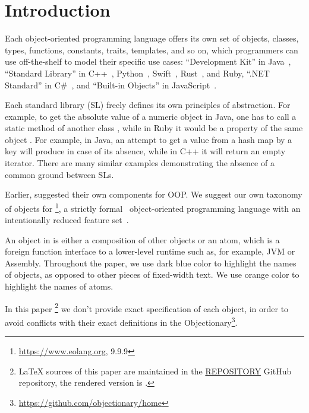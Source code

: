 
\section{Introduction}

Each object-oriented programming language offers its own set of objects,
  classes, types, functions, constants, traits, templates, and so on,
  which programmers can use off-the-shelf to model their specific use cases:
  ``Development Kit'' in Java~\citep{jdk2024,jdk8},
  ``Standard Library'' in
    C++~\citep{cpp2024,josuttis2012cpp},
    Python~\citep{python2024,hellmann2017python},
    Swift~\citep{swift2024,deitel2015swift},
    Rust~\citep{rust2024,blandy2021rust},
    and
    Ruby,
  ``.NET Standard'' in C\#~\citep{net2023,abrams2005net},
  and ``Built-in Objects'' in JavaScript~\citep{js2024,crockford2008js}.

Each standard library (SL) freely defines its own principles of abstraction.
For example, to get the absolute value of a numeric object  in Java,
  one has to call a static method of another class ,
  while in Ruby it would be a property of the same object .
For example, in Java, an attempt to get a value from a hash map by
  a key will produce  in case of its absence,
  while in C++ it will return an empty iterator.
There are many similar examples demonstrating
  the absence of a common ground between SLs.

Earlier, \citet{booch1990design} suggested their own components for OOP.
We suggest our own taxonomy of objects for \eolang{}\footnote{%
  \url{https://www.eolang.org}, 9.9.9},
  a strictly formal~\citep{kudasov2022formalizing} object-oriented
  programming language with an intentionally reduced
  feature set~\citep{bugayenko2021eolang}.

An object in \eolang{} is either a composition of other objects
  or an atom, which is a foreign function interface
  to a lower-level runtime such as, for example, JVM or Assembly.
Throughout the paper, we use dark blue color
  to highlight the names of objects,
  as opposed to other pieces of fixed-width text.
We use orange color to highlight the names of atoms.

In this paper%
  \footnote{\raggedright%
    \LaTeX{} sources of this paper are maintained in the
    \href{https://github.com/REPOSITORY}{REPOSITORY} GitHub repository,
    the rendered version is
    \href{https://github.com/REPOSITORY/releases/tag/0.0.0}{}.}
  we don't provide exact specification of each object,
  in order to avoid conflicts with their exact definitions
  in the Objectionary\footnote{\url{https://github.com/objectionary/home}}.
